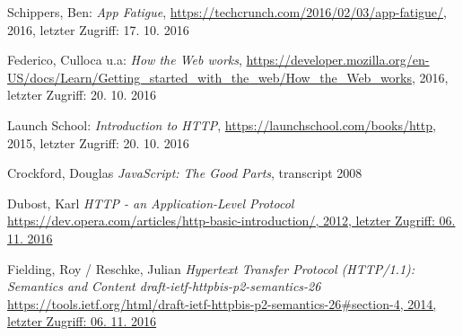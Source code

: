 \begin{thebibliography}{}
Schippers, Ben: 
\emph{App Fatigue}, 
\url{https://techcrunch.com/2016/02/03/app-fatigue/}, 2016, letzter Zugriff: 17. 10. 2016

Federico, Culloca u.a:
\emph{How the Web works}, 
\url{https://developer.mozilla.org/en-US/docs/Learn/Getting_started_with_the_web/How_the_Web_works}, 2016, letzter Zugriff: 20. 10. 2016

Launch School: 
\emph{Introduction to HTTP}, 
\url{https://launchschool.com/books/http}, 2015, letzter Zugriff: 20. 10. 2016

Crockford, Douglas 
\emph{JavaScript: The Good Parts}, transcript 2008

Dubost, Karl
\emph{HTTP - an Application-Level Protocol}
\url{https://dev.opera.com/articles/http-basic-introduction/, 2012, letzter Zugriff: 06. 11. 2016 }

Fielding, Roy / Reschke, Julian
\emph{Hypertext Transfer Protocol (HTTP/1.1): Semantics and Content draft-ietf-httpbis-p2-semantics-26}
\url{https://tools.ietf.org/html/draft-ietf-httpbis-p2-semantics-26#section-4, 2014, letzter Zugriff: 06. 11. 2016 }

\end{thebibliography}